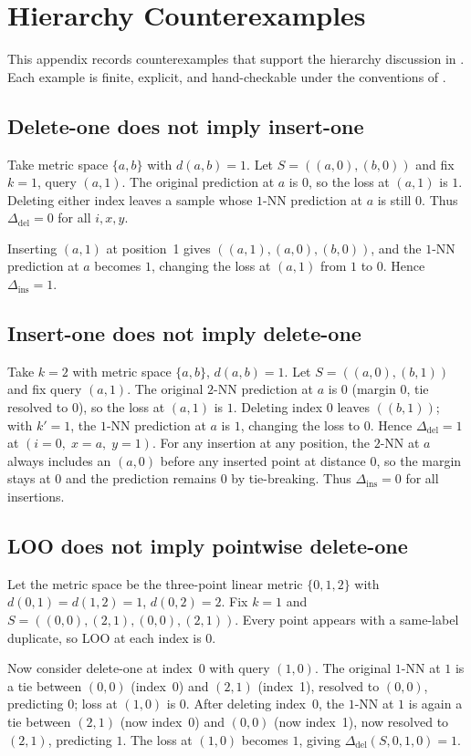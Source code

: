 \section{Hierarchy Counterexamples}
\label{app:hierarchy-counterexamples}

This appendix records counterexamples that support the hierarchy discussion in
.  Each example is finite, explicit, and
hand-checkable under the conventions of .

\subsection{Delete-one does not imply insert-one}

Take metric space $\{a, b\}$ with $d(a,b) = 1$.  Let $S = ((a,0), (b,0))$ and
fix $k=1$, query $(a,1)$.  The original prediction at $a$ is $0$, so the loss
at $(a,1)$ is $1$.  Deleting either index leaves a sample whose $1$-NN
prediction at $a$ is still $0$.  Thus $\Delta_{\mathrm{del}} = 0$ for all
$i,x,y$.

Inserting $(a,1)$ at position~1 gives $((a,1), (a,0), (b,0))$, and the $1$-NN
prediction at $a$ becomes $1$, changing the loss at $(a,1)$ from $1$ to $0$.
Hence $\Delta_{\mathrm{ins}} = 1$.

\subsection{Insert-one does not imply delete-one}

Take $k=2$ with metric space $\{a,b\}$, $d(a,b)=1$.  Let $S = ((a,0), (b,1))$
and fix query $(a,1)$.  The original $2$-NN prediction at $a$ is $0$ (margin
$0$, tie resolved to $0$), so the loss at $(a,1)$ is $1$.  Deleting index $0$
leaves $((b,1))$; with $k'=1$, the $1$-NN prediction at $a$ is $1$, changing
the loss to $0$.  Hence $\Delta_{\mathrm{del}} = 1$ at
$(i=0,\;x=a,\;y=1)$.  For any insertion at any position, the $2$-NN at $a$
always includes an $(a,0)$ before any inserted point at distance $0$, so the
margin stays at $0$ and the prediction remains $0$ by tie-breaking.  Thus
$\Delta_{\mathrm{ins}} = 0$ for all insertions.

\subsection{LOO does not imply pointwise delete-one}

Let the metric space be the three-point linear metric $\{0,1,2\}$ with
$d(0,1)=d(1,2)=1$, $d(0,2)=2$.  Fix $k=1$ and
$S = ((0,0), (2,1), (0,0), (2,1))$.  Every point appears with a same-label
duplicate, so LOO at each index is $0$.

Now consider delete-one at index~0 with query $(1,0)$.  The original $1$-NN at
$1$ is a tie between $(0,0)$ (index~0) and $(2,1)$ (index~1), resolved to
$(0,0)$, predicting $0$; loss at $(1,0)$ is $0$.  After deleting index~0, the
$1$-NN at $1$ is again a tie between $(2,1)$ (now index~0) and $(0,0)$ (now
index~1), now resolved to $(2,1)$, predicting $1$.  The loss at $(1,0)$ becomes
$1$, giving $\Delta_{\mathrm{del}}(S,0,1,0)=1$.

